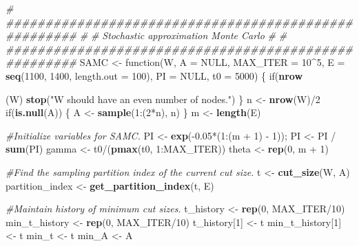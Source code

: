 \documentclass[11pt,]{article}
\newenvironment{Shaded}{\begin{snugshade}}{\end{snugshade}}
\newcommand{\KeywordTok}[1]{\textcolor[rgb]{0.13,0.29,0.53}{\textbf{{#1}}}}
\newcommand{\DataTypeTok}[1]{\textcolor[rgb]{0.13,0.29,0.53}{{#1}}}
\newcommand{\DecValTok}[1]{\textcolor[rgb]{0.00,0.00,0.81}{{#1}}}
\newcommand{\FloatTok}[1]{\textcolor[rgb]{0.00,0.00,0.81}{{#1}}}
\newcommand{\StringTok}[1]{\textcolor[rgb]{0.31,0.60,0.02}{{#1}}}
\newcommand{\CommentTok}[1]{\textcolor[rgb]{0.56,0.35,0.01}{\textit{{#1}}}}
\newcommand{\OtherTok}[1]{\textcolor[rgb]{0.56,0.35,0.01}{{#1}}}
\newcommand{\NormalTok}[1]{{#1}}
\begin{document}
\begin{Shaded}
\begin{Highlighting}[]
{{{{\CommentTok{# #####################################################}
\CommentTok{#}
\CommentTok{# Stochastic approximation Monte Carlo}
\CommentTok{#}
\CommentTok{# #####################################################}
\NormalTok{SAMC <-}\StringTok{ }\NormalTok{function(W, }\DataTypeTok{A =} \OtherTok{NULL}\NormalTok{, }\DataTypeTok{MAX_ITER =} \DecValTok{10}\NormalTok{^}\DecValTok{5}\NormalTok{, }
                 \DataTypeTok{E =} \KeywordTok{seq}\NormalTok{(}\DecValTok{1100}\NormalTok{, }\DecValTok{1400}\NormalTok{, }\DataTypeTok{length.out =} \DecValTok{100}\NormalTok{),}
                 \DataTypeTok{PI =} \OtherTok{NULL}\NormalTok{, }\DataTypeTok{t0 =} \DecValTok{5000}\NormalTok{) \{}
  \NormalTok{if(}\KeywordTok{nrow}\NormalTok{(W) %
    \KeywordTok{stop}\NormalTok{(}\StringTok{"W should have an even number of nodes."}\NormalTok{)}
  \NormalTok{\}}
  \NormalTok{n <-}\StringTok{ }\KeywordTok{nrow}\NormalTok{(W)/}\DecValTok{2} 
  \NormalTok{if(}\KeywordTok{is.null}\NormalTok{(A)) \{}
    \NormalTok{A <-}\StringTok{ }\KeywordTok{sample}\NormalTok{(}\DecValTok{1}\NormalTok{:(}\DecValTok{2}\NormalTok{*n), n)}
  \NormalTok{\}}
  \NormalTok{m <-}\StringTok{ }\KeywordTok{length}\NormalTok{(E)}
  
  \CommentTok{#Initialize variables for SAMC.}
  \NormalTok{PI <-}\StringTok{ }\KeywordTok{exp}\NormalTok{(-}\FloatTok{0.05}\NormalTok{*(}\DecValTok{1}\NormalTok{:(m +}\StringTok{ }\DecValTok{1}\NormalTok{) -}\StringTok{ }\DecValTok{1}\NormalTok{)); PI <-}\StringTok{ }\NormalTok{PI /}\StringTok{ }\KeywordTok{sum}\NormalTok{(PI)}
  \NormalTok{gamma <-}\StringTok{ }\NormalTok{t0/(}\KeywordTok{pmax}\NormalTok{(t0, }\DecValTok{1}\NormalTok{:MAX_ITER))}
  \NormalTok{theta <-}\StringTok{ }\KeywordTok{rep}\NormalTok{(}\DecValTok{0}\NormalTok{, m +}\StringTok{ }\DecValTok{1}\NormalTok{)}
  
  \CommentTok{#Find the sampling partition index of the current cut size.}
  \NormalTok{t <-}\StringTok{ }\KeywordTok{cut_size}\NormalTok{(W, A)}
  \NormalTok{partition_index <-}\StringTok{ }\KeywordTok{get_partition_index}\NormalTok{(t, E)}
  
  \CommentTok{#Maintain history of minimum cut sizes.}
  \NormalTok{t_history <-}\StringTok{ }\KeywordTok{rep}\NormalTok{(}\DecValTok{0}\NormalTok{, MAX_ITER/}\DecValTok{10}\NormalTok{)}
  \NormalTok{min_t_history <-}\StringTok{ }\KeywordTok{rep}\NormalTok{(}\DecValTok{0}\NormalTok{, MAX_ITER/}\DecValTok{10}\NormalTok{)}
  \NormalTok{t_history[}\DecValTok{1}\NormalTok{] <-}\StringTok{ }\NormalTok{t}
  \NormalTok{min_t_history[}\DecValTok{1}\NormalTok{] <-}\StringTok{ }\NormalTok{t}
  \NormalTok{min_t <-}\StringTok{ }\NormalTok{t}
  \NormalTok{min_A <-}\StringTok{ }\NormalTok{A}
  
}}}}}
\end{Highlighting}
\end{Shaded}
\end{document}

